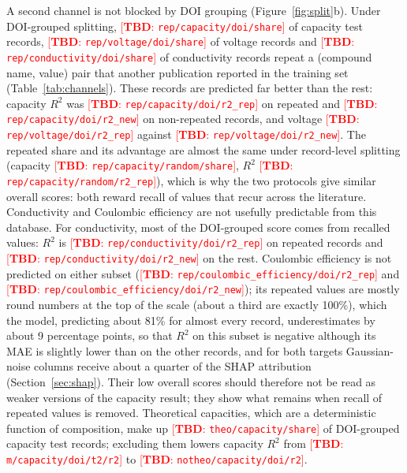 \documentclass[journal=jcisd8,manuscript=article,layout=traditional]{achemso}
\newcommand{\TBD}[1]{\textcolor{red}{[\textbf{TBD}: \nolinkurl{#1}]}}
\begin{document}
A second channel is not blocked by DOI grouping (Figure~\ref{fig:split}b). Under DOI-grouped splitting, \TBD{rep/capacity/doi/share} of capacity test records, \TBD{rep/voltage/doi/share} of voltage records and \TBD{rep/conductivity/doi/share} of conductivity records repeat a (compound name, value) pair that another publication reported in the training set (Table~\ref{tab:channels}). These records are predicted far better than the rest: capacity $R^2$ was \TBD{rep/capacity/doi/r2_rep} on repeated and \TBD{rep/capacity/doi/r2_new} on non-repeated records, and voltage \TBD{rep/voltage/doi/r2_rep} against \TBD{rep/voltage/doi/r2_new}. The repeated share and its advantage are almost the same under record-level splitting (capacity \TBD{rep/capacity/random/share}, $R^2$ \TBD{rep/capacity/random/r2_rep}), which is why the two protocols give similar overall scores: both reward recall of values that recur across the literature. Conductivity and Coulombic efficiency are not usefully predictable from this database. For conductivity, most of the DOI-grouped score comes from recalled values: $R^2$ is \TBD{rep/conductivity/doi/r2_rep} on repeated records and \TBD{rep/conductivity/doi/r2_new} on the rest. Coulombic efficiency is not predicted on either subset (\TBD{rep/coulombic_efficiency/doi/r2_rep} and \TBD{rep/coulombic_efficiency/doi/r2_new}); its repeated values are mostly round numbers at the top of the scale (about a third are exactly 100\%), which the model, predicting about 81\% for almost every record, underestimates by about 9 percentage points, so that $R^2$ on this subset is negative although its MAE is slightly lower than on the other records, and for both targets Gaussian-noise columns receive about a quarter of the SHAP attribution (Section~\ref{sec:shap}). Their low overall scores should therefore not be read as weaker versions of the capacity result; they show what remains when recall of repeated values is removed. Theoretical capacities, which are a deterministic function of composition, make up \TBD{theo/capacity/share} of DOI-grouped capacity test records; excluding them lowers capacity $R^2$ from \TBD{m/capacity/doi/t2/r2} to \TBD{notheo/capacity/doi/r2}.
\end{document}
